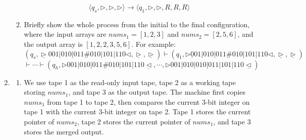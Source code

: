 \documentclass[12pt,a4paper]{article}
\makeatletter
\newtheorem*{solution}{Solution}
\theoremstyle{definition}
\renewenvironment{solution}[1][Solution] {\par\pushQED{\qed}\normalfont\topsep6\p@\@plus6\p@\relax\trivlist\item[\hskip\labelsep\bfseries#1\@addpunct{.}]\ignorespaces}{\popQED\endtrivlist\@endpefalse} \makeatother
\makeatother
\begin{document}
\begin{enumerate}
\begin{enumerate}
        \[
        \langle q_s, \triangleright, \triangleright, \triangleright\rangle
        \rightarrow \langle q_1, \triangleright, \triangleright, R, R, R \rangle
        \]
        
        \item Briefly show the whole process from the initial to the final configuration, where the input arrays are $nums_1 = [1, 2, 3]$ and $nums_2 = [2, 5, 6]$, and the output array is $[1, 2, 2, 3, 5, 6]$. For example:
        \[
        (q_s, \underline{\triangleright} 001|010|011\#010|101|110 \triangleleft, \underline{\triangleright}, \underline{\triangleright}) \vdash (q_1, \triangleright \underline{0}01|010|011\#010|101|110 \triangleleft, \underline{\triangleright}, \underline{\triangleright}) 
        \]
        \[
        \vdash \cdots \vdash (q_h, \triangleright 001|010|011\#010|101|110 \underline{\triangleleft}, \cdots, \triangleright 001|010|010|011|101|110 \underline{\triangleleft})
        \]

        
    \end{enumerate}

    {}

    \begin{solution}
        \begin{enumerate}
            \item We use tape 1 as the read-only input tape, tape 2 as a working tape storing \(nums_1\), and tape 3 as the output tape. The machine first copies \(nums_1\) from tape 1 to tape 2, then compares the current 3-bit integer on tape 1 with the current 3-bit integer on tape 2. Tape 1 stores the current pointer of \(nums_2\), tape 2 stores the current pointer of \(nums_1\), and tape 3 stores the merged output.


\end{enumerate}
\end{solution}
\end{enumerate}
\end{document}
